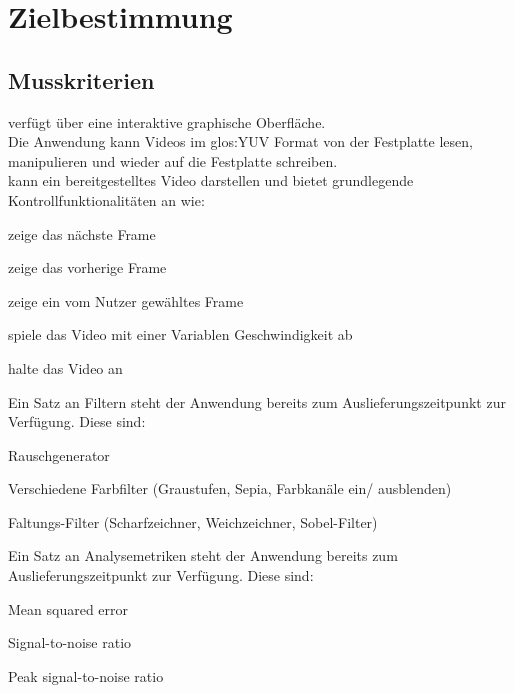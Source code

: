 \chapter{Zielbestimmung}

\section{Musskriterien}
\setcounter{counterKriterien}{0}
 \projektTitel verfügt über eine interaktive graphische Oberfläche.\\
 Die Anwendung kann Videos im \gls{glos:YUV} Format von der Festplatte lesen, manipulieren und wieder auf die Festplatte schreiben.\\
 \projektTitel kann ein bereitgestelltes Video darstellen und bietet grundlegende Kontrollfunktionalitäten an wie:
\begin{compactitem}
\item zeige das nächste Frame
\item zeige das vorherige Frame
\item zeige ein vom Nutzer gewähltes Frame
\item spiele das Video mit einer Variablen Geschwindigkeit ab
\item halte das Video an	
\end{compactitem} 
 Ein Satz an Filtern steht der Anwendung bereits zum Auslieferungszeitpunkt zur Verfügung. 
Diese sind:
\begin{compactitem}
\item Rauschgenerator
\item Verschiedene Farbfilter (Graustufen, Sepia, Farbkanäle ein/ ausblenden)
\item Faltungs-Filter (Scharfzeichner, Weichzeichner, Sobel-Filter)
\end{compactitem}
 Ein Satz an Analysemetriken steht der Anwendung bereits zum Auslieferungszeitpunkt zur Verfügung.
Diese sind:
\begin{compactitem}
\item Mean squared error
\item Signal-to-noise ratio
\item Peak signal-to-noise ratio
\end{compactitem}

